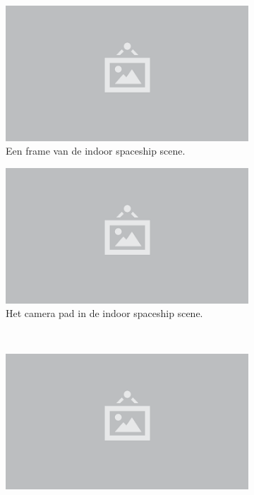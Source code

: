 \begin{figure}[p]
  \begin{subfigure}[b]{.49\linewidth}
    \centering\includegraphics{./img/raw/placeholder.png}
    \caption{Een frame van de indoor spaceship scene.}\label{fig:test-suite-spaceship:frame}
  \end{subfigure}%
  \begin{subfigure}[b]{.49\linewidth}
    \centering\includegraphics{./img/raw/placeholder.png}
    \caption{Het camera pad in de indoor spaceship scene.}\label{fig:test-suite-spaceship:camera}
  \end{subfigure}
  \\
  \begin{subfigure}[b]{.49\linewidth}
    \centering\includegraphics{./img/raw/placeholder.png}

\end{subfigure}
\end{figure}
